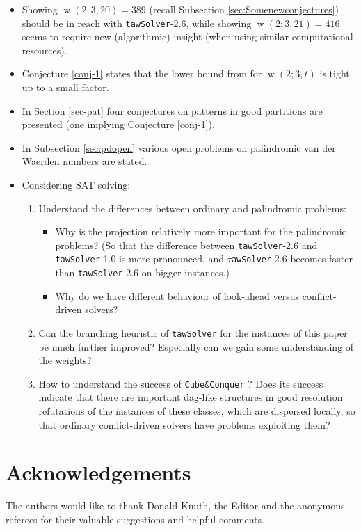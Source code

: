 \documentclass[final,3p,times]{elsarticle}
\theoremstyle{definition}
\newcommand{\tawsolver}{\texttt{tawSolver}}
\newcommand{\otawsolver}{\tawsolver-1.0}
\newcommand{\ntawsolver}{\tawsolver-2.6}
\newcommand{\ttawsolver}{$\tau$\texttt{awSolver}-2.6}
\newcommand{\cubeconq}{\texttt{Cube\:\&\:Conquer}}
\DeclareMathOperator{\vdw}{w}
\begin{document}
\begin{itemize}
\item Showing $\vdw(2;3,20) = 389$ (recall Subsection \ref{sec:Somenewconjectures}) should be in reach with \ntawsolver, while showing $\vdw(2;3,21) = 416$ seems to require new (algorithmic) insight (when using similar computational resources).
\item Conjecture \ref{conj-1} states that the lower bound from \cite{blr2008} for $\vdw(2;3,t)$ is tight up to a small factor.
\item In Section \ref{sec-pat} four conjectures on patterns in good partitions are presented (one implying Conjecture \ref{conj-1}).
\item In Subsection \ref{sec:pdopen} various open problems on palindromic van der Waerden numbers are stated.
\item Considering SAT solving:
  \begin{enumerate}
  \item Understand the differences between ordinary and palindromic problems:
    \begin{itemize}
    \item Why is the projection relatively more important for the palindromic problems? (So that the difference between \ntawsolver{} and \otawsolver{} is more pronounced, and \ttawsolver{} becomes faster than \ntawsolver{} on bigger instances.)
    \item Why do we have different behaviour of look-ahead versus conflict-driven solvers?
    \end{itemize}
  \item Can the branching heuristic of \tawsolver{} for the instances of this paper be much further improved? Especially can we gain some understanding of the weights?
  \item How to understand the success of \cubeconq{} ? Does its success indicate that there are important dag-like structures in good resolution refutations of the instances of these classes, which are dispersed locally, so that ordinary conflict-driven solvers have problems exploiting them?
  \end{enumerate}
\end{itemize}

\section*{Acknowledgements}
The authors would like to thank Donald Knuth, the Editor and the anonymous referees for their valuable suggestions and helpful comments.
\end{document}
